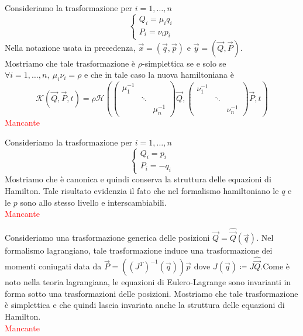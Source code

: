 \begin{example}
    Consideriamo la trasformazione per $ i = 1, \ldots, n $
    \[
        \begin{cases}
            Q_i = \mu_i q_i \\
            P_i = \nu_i p_i
        \end{cases}
    \]
    Nella notazione usata in precedenza, $ \vec{x} = (\vec{q}, \vec{p}) $ e $ \vec{y} = (\vec{Q}, \vec{P}) $. \\
    Mostriamo che tale trasformazione è $ \rho $-simplettica se e solo se $ \forall i = 1, \ldots, n, \ \mu_i \nu_i = \rho $ e che in tale caso la nuova hamiltoniana è
    \[
        \mathcal{K}(\vec{Q}, \vec{P}, t) = \rho \mathcal{H}\left(
        \begin{pmatrix}
            \mu_1^{-1} & & \\
            & \ddots & \\
            & & \mu_n^{-1}
        \end{pmatrix}
        \vec{Q},
        \begin{pmatrix}
            \nu_1^{-1} & & \\
            & \ddots & \\
            & & \nu_n^{-1}
        \end{pmatrix}
        \vec{P},
        t
        \right)
    \]
    \textcolor{red}{Mancante}
\end{example}

\begin{example}
    Consideriamo la trasformazione per $ i = 1, \ldots, n $
    \[
        \begin{cases}
            Q_i = p_i \\
            P_i = -q_i
        \end{cases}
    \]
    Mostriamo che è canonica e quindi conserva la struttura delle equazioni di Hamilton. Tale risultato evidenzia il fato che nel formalismo hamiltoniano le $ q $ e le $ p $ sono allo stesso livello e interscambiabili. \\
    \textcolor{red}{Mancante}
\end{example}

\begin{example}
    Consideriamo una trasformazione generica delle posizioni $ \vec{Q} = \hat{\vec{Q}}(\vec{q}) $. Nel formalismo lagrangiano, tale trasformazione induce una trasformazione dei momenti coniugati data da $ \vec{P} = ((J^T)^{-1}(\vec{q}))\vec{p} $ dove $ J(\vec{q}) \coloneqq J \hat{\vec{Q}} $.Come è noto nella teoria lagrangiana, le equazioni di Eulero-Lagrange sono invarianti in forma sotto una trasformazioni delle posizioni. Mostriamo che tale trasformazione è simplettica e che quindi lascia invariata anche la struttura delle equazioni di Hamilton. \\
    \textcolor{red}{Mancante}
\end{example}